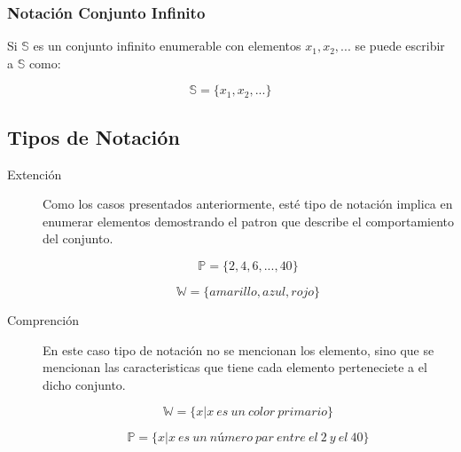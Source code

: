 \documentclass[a4paper,dvipsnames]{book}
\begin{document}
    \subsubsection{Notación Conjunto Infinito}


    Si $ \mathbb S$ es un conjunto infinito enumerable con elementos $
    x_1,x_2,...$ se puede escribir a $ \mathbb S $ como:

    \begin{equation*}

        \mathbb S=\{x_1,x_2,...\}
    \end{equation*}

    \subsection{Tipos de Notación}


    \begin{description}
        \item[Extención] Como los casos presentados anteriormente, esté tipo de
            notación implica en enumerar elementos demostrando el patron que
            describe el comportamiento del conjunto.

            \begin{equation*}

                \mathbb P=\{2,4,6,...,40\}
            \end{equation*}

            \begin{equation*}

                \mathbb W=\{amarillo,azul,rojo\}
            \end{equation*}

        \item[Comprención] En este caso tipo de notación no se mencionan los
            elemento, sino que se mencionan las caracteristicas que tiene cada
            elemento perteneciete a el dicho conjunto.

            \begin{equation*}

                 \mathbb W = \{x|x\ es\ un\ color\ primario\}
            \end{equation*}

            \begin{equation*}

                \mathbb P=\{x|x\ es\ un\ número\ par\ entre\ el\ 2\ y\ el\ 40\}
            \end{equation*}
    \end{description}
\end{document}

